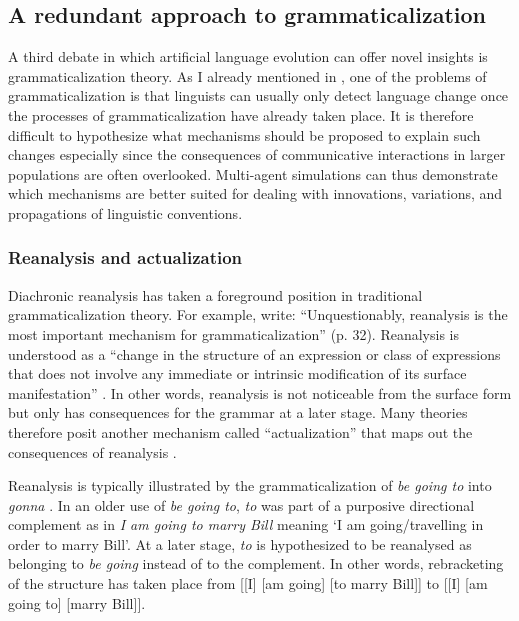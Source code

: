 \subsection{A redundant approach to grammaticalization}
\label{s:actualization}

A third debate in which artificial language evolution can offer novel insights is grammaticalization theory. As I already mentioned in , one of the problems of grammaticalization is that linguists can usually only detect language change once the processes of grammaticalization have already taken place. It is therefore difficult to hypothesize what mechanisms should be proposed to explain such changes especially since the consequences of communicative interactions in larger populations are often overlooked. Multi-agent simulations can thus demonstrate which mechanisms are better suited for dealing with innovations, variations, and propagations of linguistic conventions.


\subsubsection{Reanalysis and actualization} 
Diachronic reanalysis has taken a foreground position in traditional grammaticalization theory. For example, \citet{hopper93grammaticalization} write:  ``Unquestionably, reanalysis is the most important mechanism for grammaticalization''  (p. 32). Reanalysis is understood as a  ``change in the structure of an expression or class of expressions that does not involve any immediate or intrinsic modification of its surface manifestation''  \citep[59]{langacker77syntactic}.
 In other words, reanalysis is not noticeable from the surface form but only has consequences for the grammar at a later stage. Many theories therefore posit another mechanism called ``actualization'' that maps out the consequences of reanalysis \citep{timberlake77reanalysis}.

Reanalysis is typically illustrated by the grammaticalization of {\em be going to} into {\em gonna} \citep[2--4]{hopper93grammaticalization}. In an older use of {\em be going to}, {\em to} was part of a purposive directional complement as in {\em I am going to marry Bill} meaning `I am going/travelling in order to marry Bill'. At a later stage, {\em to} is hypothesized to be reanalysed as belonging to {\em be going} instead of to the complement. In other words, rebracketing of the structure has taken place from [[I] [am going] [to marry Bill]] to [[I] [am going to] [marry Bill]].

